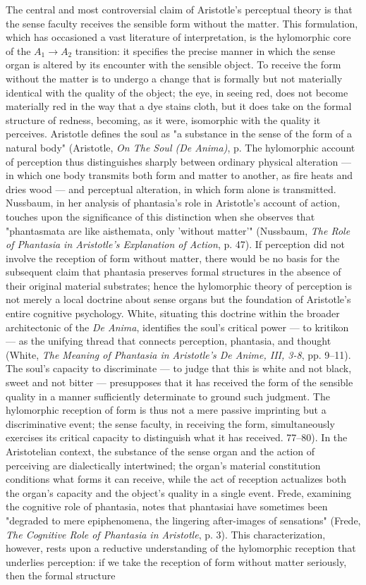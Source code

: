 The central and most controversial claim of Aristotle's perceptual theory is that the sense faculty receives the sensible form without the matter. This formulation, which has occasioned a vast literature of interpretation, is the hylomorphic core of the $A_1$$\to$$A_2$ transition: it specifies the precise manner in which the sense organ is altered by its encounter with the sensible object. To receive the form without the matter is to undergo a change that is formally but not materially identical with the quality of the object; the eye, in seeing red, does not become materially red in the way that a dye stains cloth, but it does take on the formal structure of redness, becoming, as it were, isomorphic with the quality it perceives. Aristotle defines the soul as "a substance in the sense of the form of a natural body" (Aristotle, \textit{On The Soul (De Anima)}, p. The hylomorphic account of perception thus distinguishes sharply between ordinary physical alteration --- in which one body transmits both form and matter to another, as fire heats and dries wood --- and perceptual alteration, in which form alone is transmitted. Nussbaum, in her analysis of phantasia's role in Aristotle's account of action, touches upon the significance of this distinction when she observes that "phantasmata are like aisthemata, only 'without matter'" (Nussbaum, \textit{The Role of Phantasia in Aristotle's Explanation of Action}, p. 47). If perception did not involve the reception of form without matter, there would be no basis for the subsequent claim that phantasia preserves formal structures in the absence of their original material substrates; hence the hylomorphic theory of perception is not merely a local doctrine about sense organs but the foundation of Aristotle's entire cognitive psychology. White, situating this doctrine within the broader architectonic of the \textit{De Anima}, identifies the soul's critical power --- to kritikon --- as the unifying thread that connects perception, phantasia, and thought (White, \textit{The Meaning of Phantasia in Aristotle's De Anime, III, 3-8}, pp. 9--11). The soul's capacity to discriminate --- to judge that this is white and not black, sweet and not bitter --- presupposes that it has received the form of the sensible quality in a manner sufficiently determinate to ground such judgment. The hylomorphic reception of form is thus not a mere passive imprinting but a discriminative event; the sense faculty, in receiving the form, simultaneously exercises its critical capacity to distinguish what it has received. 77--80). In the Aristotelian context, the substance of the sense organ and the action of perceiving are dialectically intertwined; the organ's material constitution conditions what forms it can receive, while the act of reception actualizes both the organ's capacity and the object's quality in a single event. Frede, examining the cognitive role of phantasia, notes that phantasiai have sometimes been "degraded to mere epiphenomena, the lingering after-images of sensations" (Frede, \textit{The Cognitive Role of Phantasia in Aristotle}, p. 3). This characterization, however, rests upon a reductive understanding of the hylomorphic reception that underlies perception: if we take the reception of form without matter seriously, then the formal structure 